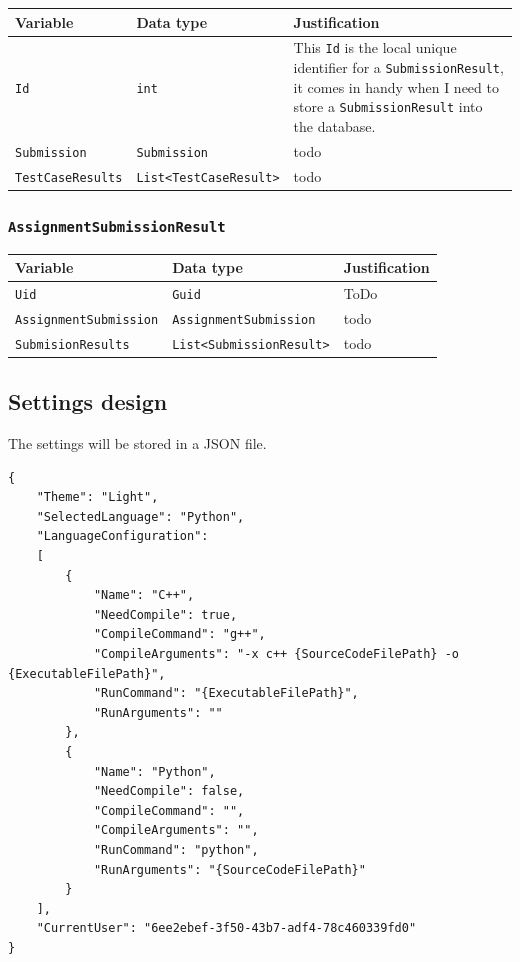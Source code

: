 \documentclass[a4paper]{report}
\begin{document}
\begin{tabulary}{\textwidth}{|l|l|L|}
    \hline
    Variable & Data type & Justification \\
    \hline
    \texttt{Id} & \texttt{int} & This \texttt{Id} is the local unique identifier for a \texttt{SubmissionResult}, it comes in handy when I need to store a \texttt{SubmissionResult} into the database.\\
    \hline
    \texttt{Submission} & \texttt{Submission} & todo \\
    \hline
    \texttt{TestCaseResults} & \texttt{List<TestCaseResult>} & todo\\
    \hline
 \end{tabulary}

\subsubsection{\texttt{AssignmentSubmissionResult}}

\begin{tabulary}{\textwidth}{|l|l|L|}
    \hline
    Variable & Data type & Justification \\
    \hline
    \texttt{Uid} & \texttt{Guid} & ToDo \\
    \hline
    \texttt{AssignmentSubmission} & \texttt{AssignmentSubmission} & todo \\
    \hline
    \texttt{SubmisionResults} & \texttt{List<SubmissionResult>} & todo \\
    \hline
\end{tabulary}

\subsection{Settings design}

The settings will be stored in a JSON file.

\begin{verbatim}
{
    "Theme": "Light",
    "SelectedLanguage": "Python",
    "LanguageConfiguration": 
    [
        {
            "Name": "C++",
            "NeedCompile": true,
            "CompileCommand": "g++",
            "CompileArguments": "-x c++ {SourceCodeFilePath} -o {ExecutableFilePath}",
            "RunCommand": "{ExecutableFilePath}",
            "RunArguments": ""
        },
        {
            "Name": "Python",
            "NeedCompile": false,
            "CompileCommand": "",
            "CompileArguments": "",
            "RunCommand": "python",
            "RunArguments": "{SourceCodeFilePath}"
        }
    ],
    "CurrentUser": "6ee2ebef-3f50-43b7-adf4-78c460339fd0"
}
\end{verbatim}
\end{document}
